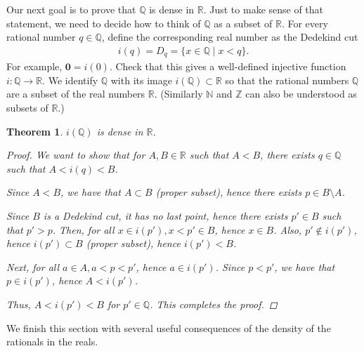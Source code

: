 \documentclass[11pt]{article}
\newcommand{\bbN}{\mathbb{N}}
\newcommand{\bbQ}{\mathbb{Q}}
\newcommand{\bbR}{\mathbb{R}}
\newcommand{\bbZ}{\mathbb{Z}}
\newcommand{\arr}{\longrightarrow}
\newtheorem{theorem}{Theorem}[section]
\theoremstyle{definition}
\numberwithin{equation}{subsection}
\begin{document}
Our next goal is to prove that $\bbQ$ is dense in $\bbR$. Just to make sense of that statement, we need to decide how to think of $\bbQ$ as a subset of $\bbR$.  For every rational number $q\in\bbQ$, define the corresponding real number as the Dedekind cut
\begin{align*}
	i(q) = D_q =  \{x\in\bbQ\mid x<q\}.
\end{align*}
For example, $\mathbf{0} = i(0)$. Check that this gives a well-defined injective function $i\colon \bbQ \arr \bbR$. We identify $\bbQ$ with its image $i(\bbQ)\subset\bbR$ so that the rational numbers $\bbQ$ are a subset of the real numbers $\bbR$. (Similarly $\bbN $ and $\bbZ$ can also be understood as subsets of $\bbR$.)



\begin{theorem}\label{density}
	$i(\bbQ)$ is dense in $\bbR$.

\begin{proof}
We want to show that for $A,B \in \bbR$ such that $A<B$, there exists $q \in \bbQ$ such that $A<i(q)<B$.

Since $A <B$, we have that $A \subset B$ (proper subset), hence there exists $p \in B\setminus A$.

Since $B$ is a Dedekind cut, it has no last point, hence there exists $p' \in B$ such that $p' > p$. Then, for all $x \in i(p'), x <p' \in B$, hence $x \in B$. Also, $p' \notin i(p')$, hence $i(p') \subset B$ (proper subset), hence $i(p') < B$.

Next, for all $a \in A, a<p<p'$, hence $a \in i(p')$. Since $p <p'$, we have that $p \in i(p')$, hence $A <i(p')$. 

Thus, $A<i(p')<B$ for $p' \in \bbQ$. This completes the proof.

\renewcommand\qedsymbol{QED}
\end{proof}
\end{theorem}




We finish this section with several useful consequences of the density of the rationals in the reals. 
\end{document}
